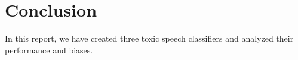 \documentclass[11pt]{article}
\begin{document}
    \section{Conclusion}

    In this report, we have created three toxic speech classifiers and analyzed their performance and biases.

    \clearpage
    
    



\end{document}
